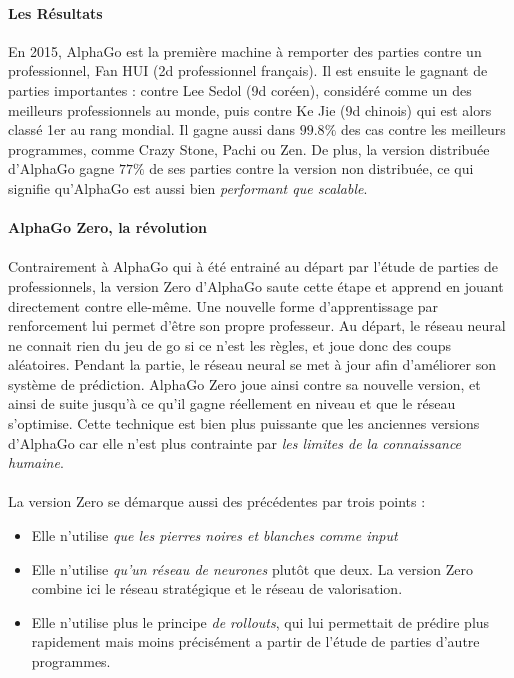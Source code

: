 \paragraph{Les Résultats} En 2015, AlphaGo est la première machine à remporter des parties contre un professionnel, Fan HUI (2d professionnel
français). Il est ensuite le gagnant de parties importantes : contre Lee Sedol (9d coréen), considéré comme un des meilleurs professionnels
au monde, puis contre Ke Jie (9d chinois) qui est alors classé 1er au rang mondial. Il gagne aussi dans \begin{math}99.8\%\end{math} des cas contre
les meilleurs programmes, comme Crazy Stone, Pachi ou Zen. De plus, la version distribuée d'AlphaGo gagne \begin{math}77\%\end{math} de ses parties
contre la version non distribuée, ce qui signifie qu'AlphaGo est aussi bien \emph{performant que scalable}.

\paragraph{AlphaGo Zero, la révolution}

\paragraph{} Contrairement à AlphaGo qui à été entrainé au départ par l'étude de parties de professionnels, la version Zero d'AlphaGo saute
cette étape et apprend en jouant directement contre elle-même. Une nouvelle forme \cite{AlphaGo2} d'apprentissage par renforcement lui permet
d'être son propre professeur. Au départ, le réseau neural ne connait rien du jeu de go si ce n'est les règles, et joue donc des coups aléatoires.
Pendant la partie, le réseau neural se met à jour afin d'améliorer son système de prédiction. AlphaGo Zero joue ainsi contre sa nouvelle version,
et ainsi de suite jusqu'à ce qu'il gagne réellement en niveau et que le réseau s'optimise. Cette technique est bien plus puissante que les anciennes
versions d'AlphaGo car elle n'est plus contrainte par \emph{les limites de la connaissance humaine}. 

\paragraph{} La version Zero se démarque aussi des précédentes par trois points :

\begin{itemize}
    \item Elle n'utilise \emph{que les pierres noires et blanches comme input}
    \item Elle n'utilise \emph{qu'un réseau de neurones} plutôt que deux. La version Zero combine ici le réseau stratégique et le réseau de valorisation.
    \item Elle n'utilise plus le principe \emph{de rollouts}, qui lui permettait de prédire plus rapidement mais moins précisément a partir de l'étude de parties d'autre programmes. 
\end{itemize}

